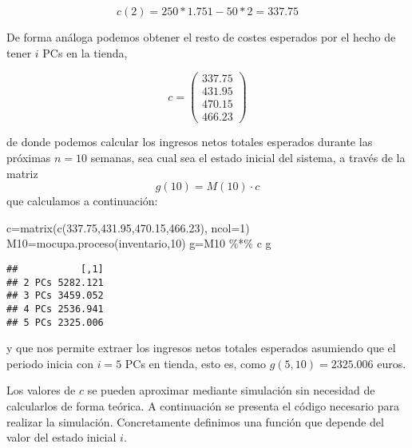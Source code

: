 \documentclass[
]{book}
\newenvironment{Shaded}{\begin{snugshade}}{\end{snugshade}}
\newcommand{\AttributeTok}[1]{\textcolor[rgb]{0.77,0.63,0.00}{#1}}
\newcommand{\DecValTok}[1]{\textcolor[rgb]{0.00,0.00,0.81}{#1}}
\newcommand{\FloatTok}[1]{\textcolor[rgb]{0.00,0.00,0.81}{#1}}
\newcommand{\FunctionTok}[1]{\textcolor[rgb]{0.00,0.00,0.00}{#1}}
\newcommand{\NormalTok}[1]{#1}
\newcommand{\OtherTok}[1]{\textcolor[rgb]{0.56,0.35,0.01}{#1}}
\newcommand{\SpecialCharTok}[1]{\textcolor[rgb]{0.00,0.00,0.00}{#1}}
\theoremstyle{definition}
\theoremstyle{definition}
\theoremstyle{definition}
\theoremstyle{definition}
\theoremstyle{remark}
\begin{document}
\[c(2) =  250*1.751 -50*2 = 337.75\]

De forma análoga podemos obtener el resto de costes esperados por el hecho de tener \(i\) PCs en la tienda,

\[c = 
\begin{pmatrix}
337.75 \\
431.95 \\
470.15 \\
466.23 
\end{pmatrix}\]

de donde podemos calcular los ingresos netos totales esperados durante las próximas \(n=10\) semanas, sea cual sea el estado inicial del sistema, a través de la matriz \[g(10)=M(10) \cdot c\] que calculamos a continuación:

\begin{Shaded}
\begin{Highlighting}[]
\NormalTok{c}\OtherTok{=}\FunctionTok{matrix}\NormalTok{(}\FunctionTok{c}\NormalTok{(}\FloatTok{337.75}\NormalTok{,}\FloatTok{431.95}\NormalTok{,}\FloatTok{470.15}\NormalTok{,}\FloatTok{466.23}\NormalTok{), }\AttributeTok{ncol=}\DecValTok{1}\NormalTok{)}
\NormalTok{M10}\OtherTok{=}\FunctionTok{mocupa.proceso}\NormalTok{(inventario,}\DecValTok{10}\NormalTok{)}
\NormalTok{g}\OtherTok{=}\NormalTok{M10 }\SpecialCharTok{\%*\%}\NormalTok{ c}
\NormalTok{g}
\end{Highlighting}
\end{Shaded}

\begin{verbatim}
##           [,1]
## 2 PCs 5282.121
## 3 PCs 3459.052
## 4 PCs 2536.941
## 5 PCs 2325.006
\end{verbatim}

y que nos permite extraer los ingresos netos totales esperados asumiendo que el periodo inicia con \(i=5\) PCs en tienda, esto es, como \(g(5,10)=2325.006\) euros.

Los valores de \(c\) se pueden aproximar mediante simulación sin necesidad de calcularlos de forma teórica. A continuación se presenta el código necesario para realizar la simulación. Concretamente definimos una función que depende del valor del estado inicial \(i\).
\end{document}
